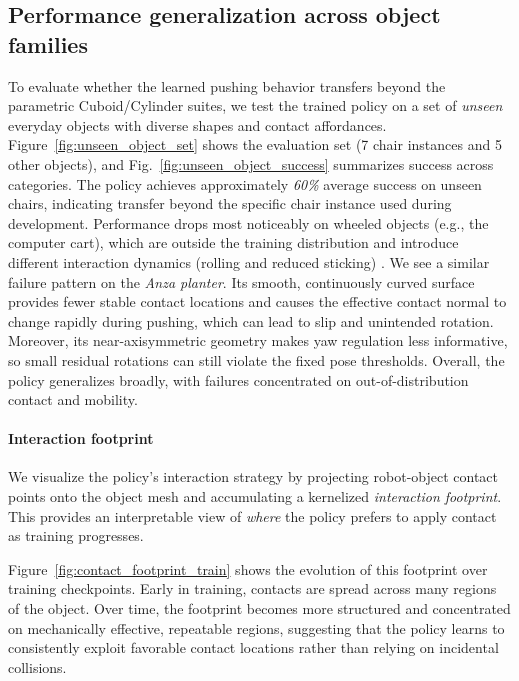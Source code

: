 \subsection{Performance generalization across object families}

\label{subsec:results_per_object}


To evaluate whether the learned pushing behavior transfers beyond the parametric Cuboid/Cylinder suites, we test the trained policy on a set of \emph{unseen} everyday objects with diverse shapes and contact affordances. Figure~\ref{fig:unseen_object_set} shows the evaluation set (7 chair instances and 5 other objects), and Fig.~\ref{fig:unseen_object_success} summarizes success across categories. The policy achieves approximately \textit{60\%} average success on unseen chairs, indicating transfer beyond the specific chair instance used during development. Performance drops most noticeably on wheeled objects (e.g., the computer cart), which are outside the training distribution and introduce different interaction dynamics (rolling and reduced sticking) \cite{Scholz2011CartPushing,Mericli2013PushManipulationCasters}. We see a similar failure pattern on the \emph{Anza planter}. Its smooth, continuously curved surface provides fewer stable contact locations and causes the effective contact normal to change rapidly during pushing, which can lead to slip and unintended rotation. Moreover, its near-axisymmetric geometry makes yaw regulation less informative, so small residual rotations can still violate the fixed pose thresholds. Overall, the policy generalizes broadly, with failures concentrated on out-of-distribution contact and mobility.



\paragraph{Interaction footprint}
\label{subsec:results_contact_footprint}

We visualize the policy’s interaction strategy by projecting robot-object contact points onto the object mesh and accumulating a kernelized \emph{interaction footprint}. This provides an interpretable view of \emph{where} the policy prefers to apply contact as training progresses.

Figure~\ref{fig:contact_footprint_train} shows the evolution of this footprint over training checkpoints. Early in training, contacts are %
spread across many regions of the object. Over time, the footprint becomes more structured and concentrated on mechanically effective, repeatable regions, suggesting that the policy learns to consistently exploit favorable contact locations rather than relying on incidental collisions.

